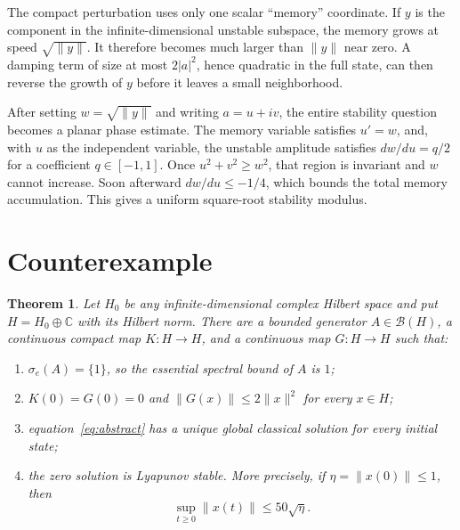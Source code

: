 \documentclass[11pt]{article}
\newtheorem{theorem}{Theorem}
\newcommand{\C}{\mathbb C}
\begin{document}
The compact perturbation uses only one scalar ``memory'' coordinate.  If $y$
is the component in the infinite-dimensional unstable subspace, the memory
grows at speed $\sqrt{\|y\|}$.  It therefore becomes much larger than $\|y\|$
near zero.  A damping term of size at most $2|a|^2$, hence quadratic in the
full state, can then reverse the growth of $y$ before it leaves a small
neighborhood.

After setting $w=\sqrt{\|y\|}$ and writing $a=u+iv$, the entire stability
question becomes a planar phase estimate.  The memory variable satisfies
$u'=w$, and, with $u$ as the independent variable, the unstable amplitude
satisfies $dw/du=q/2$ for a coefficient $q\in[-1,1]$.  Once
$u^2+v^2\ge w^2$, that region is invariant and $w$ cannot increase.  Soon
afterward $dw/du\le-1/4$, which bounds the total memory accumulation.  This
gives a uniform square-root stability modulus.

\section{Counterexample}

\begin{theorem}\label{thm:main}
Let $H_0$ be any infinite-dimensional complex Hilbert space and put
$H=H_0\oplus\C$ with its Hilbert norm.  There are a bounded generator
$A\in\mathcal B(H)$, a continuous compact map $K:H\to H$, and a continuous
map $G:H\to H$ such that:
\begin{enumerate}
\item $\sigma_e(A)=\{1\}$, so the essential spectral bound of $A$ is $1$;
\item $K(0)=G(0)=0$ and $\|G(x)\|\le2\|x\|^2$ for every $x\in H$;
\item equation~\eqref{eq:abstract} has a unique global classical solution for
every initial state;
\item the zero solution is Lyapunov stable.  More precisely, if
$\eta=\|x(0)\|\le1$, then
\[
 \sup_{t\ge0}\|x(t)\|\le50\sqrt{\eta}.
\]
\end{enumerate}
\end{theorem}
\end{document}
